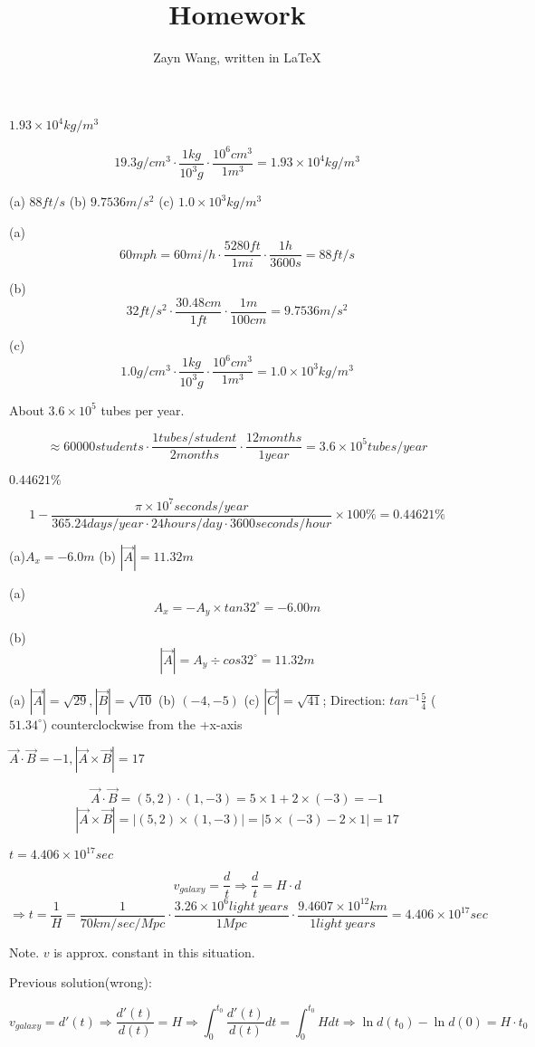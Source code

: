 \documentclass{homework}
\author{Zayn Wang, written in \LaTeX}
\title{Homework}
\begin{document}
 \maketitle

\newcommand\degree{^\circ}

\newcommand\rarr{\rightarrow}

\newcommand\rArr{\Rightarrow}


\question $1.93 \times 10^4 kg/m^3$

$$
19.3 g/cm^3 \cdot \frac{1 kg}{10^3 g} \cdot \frac{10^6 cm^3}{1 m^3} = 1.93 \times 10^4 kg/m^3
$$

\question (a) $88 ft/s$ (b) $9.7536 m/s^2$ (c) $1.0 \times 10^3 kg/m^3$

(a)
$$
60 mph = 60 mi/h \cdot \frac{5280 ft}{1 mi} \cdot \frac{1 h}{3600 s} = 88 ft/s
$$

(b)
$$
32 ft/s^2 \cdot \frac{30.48 cm}{1 ft} \cdot \frac{1 m}{100 cm} = 9.7536 m/s^2
$$

(c)
$$
1.0 g/cm^3 \cdot \frac{1 kg}{10^3 g} \cdot \frac{10^6 cm^3}{1 m^3} = 1.0 \times 10^3 kg/m^3
$$

\question About $3.6 \times 10^5$ tubes per year.

$$
\approx 60000 students \cdot \frac{1 tubes/student}{2 months} \cdot \frac{12 months}{1 year} = 3.6 \times 10^5 tubes/year 
$$

\question $0.44621\%$

$$
1 - \frac{\pi \times 10^7 seconds/year}{365.24 days/year \cdot 24 hours/day \cdot 3600 seconds/hour} \times 100\% = 0.44621\%
$$

\question (a)$A_x = - 6.0 m$ (b) $|\vec{A}| = 11.32 m$

(a)
$$
A_x = - A_y \times tan32\degree = - 6.00 m
$$

(b)
$$
|\vec{A}| = A_y \div cos32\degree = 11.32 m
$$

\question (a) $|\vec{A}| = \sqrt{29}, |\vec{B}| = \sqrt{10}$ (b) $(-4, -5)$ (c) $|\vec{C}| = \sqrt{41}$; Direction: $tan^{-1}{\frac{5}{4}}$ ($51.34\degree$) counterclockwise from the +x-axis

\question $\vec{A} \cdot \vec{B} = -1, |\vec{A} \times \vec{B}| = 17$

$$
\vec{A} \cdot \vec{B} = (5, 2) \cdot (1, -3) = 5 \times 1 + 2 \times (-3) = -1
$$
$$
|\vec{A} \times \vec{B}| = |(5, 2) \times (1, -3)| = |5 \times (-3) - 2 \times 1| = 17
$$

\question $t = 4.406 \times 10^{17} sec$

$$
v_{galaxy} = \frac{d}{t} \rArr \frac{d}{t} = H \cdot d
$$
$$
\rArr t = \frac{1}{H} = \frac{1}{70km/sec/Mpc} \cdot \frac{3.26 \times 10^6 light \ years}{1 Mpc} \cdot \frac{9.4607 \times 10^{12} km}{1 light \ years} = 4.406 \times 10^{17} sec
$$

Note. $v$ is approx. constant in this situation.

Previous solution(wrong):

$$
v_{galaxy} = d'(t) \rArr \frac{d'(t)}{d(t)} = H \rArr \int_{0}^{t_{0}}{\frac{d'(t)}{d(t)}}dt = \int_{0}^{t_0}Hdt \rArr \ln{d(t_0)} - \ln{d(0)} = H \cdot t_0
$$
\end{document}
